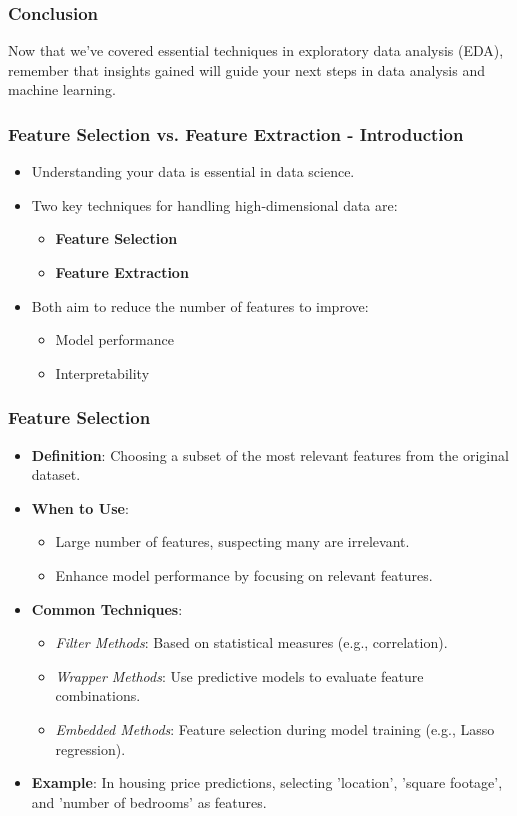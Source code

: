 \documentclass[aspectratio=169]{beamer}
\begin{document}
\begin{frame}
    \frametitle{Conclusion}
    Now that we've covered essential techniques in exploratory data analysis (EDA), remember that insights gained will guide your next steps in data analysis and machine learning.
\end{frame}

\begin{frame}[fragile]
    \frametitle{Feature Selection vs. Feature Extraction - Introduction}
    \begin{itemize}
        \item Understanding your data is essential in data science.
        \item Two key techniques for handling high-dimensional data are:
        \begin{itemize}
            \item \textbf{Feature Selection}
            \item \textbf{Feature Extraction}
        \end{itemize}
        \item Both aim to reduce the number of features to improve:
        \begin{itemize}
            \item Model performance
            \item Interpretability
        \end{itemize}
    \end{itemize}
\end{frame}

\begin{frame}[fragile]
    \frametitle{Feature Selection}
    \begin{itemize}
        \item \textbf{Definition}: Choosing a subset of the most relevant features from the original dataset.
        \item \textbf{When to Use}:
        \begin{itemize}
            \item Large number of features, suspecting many are irrelevant.
            \item Enhance model performance by focusing on relevant features.
        \end{itemize}
        \item \textbf{Common Techniques}:
        \begin{itemize}
            \item \textit{Filter Methods}: Based on statistical measures (e.g., correlation).
            \item \textit{Wrapper Methods}: Use predictive models to evaluate feature combinations.
            \item \textit{Embedded Methods}: Feature selection during model training (e.g., Lasso regression).
        \end{itemize}
        \item \textbf{Example}: In housing price predictions, selecting 'location', 'square footage', and 'number of bedrooms' as features.
    \end{itemize}
\end{frame}
\end{document}

